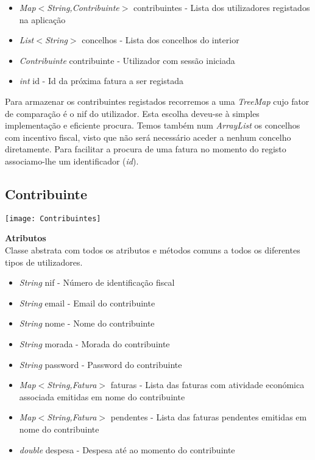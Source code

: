 \documentclass[10pt,a4paper]{article}
\begin{document}
\begin{itemize}
 \item \textit{Map$<$String,Contribuinte$>$} contribuintes - Lista dos utilizadores registados na aplicação
 \item \textit{List$<$String$>$} concelhos - Lista dos concelhos do interior
 \item \textit{Contribuinte} contribuinte - Utilizador com sessão iniciada
 \item \textit{int} id - Id da próxima fatura a ser registada
\end{itemize}

Para armazenar os contribuintes registados recorremos a uma \textit{TreeMap} cujo fator de comparação é o nif do utilizador. Esta escolha deveu-se à simples implementação e eficiente procura. Temos também num \textit{ArrayList} os concelhos com incentivo fiscal, visto que não será necessário aceder a nenhum concelho diretamente. Para facilitar a procura de uma fatura no momento do registo associamo-lhe um identificador (\textit{id}). 

\subsection{Contribuinte}
\label{sec:solucao}

\begin{center}
\graphicspath{ {/home/jessica/Desktop/} }
\texttt{[image: Contribuintes]}\\
\end{center}

{\bf{Atributos}}\\

Classe abstrata com todos os atributos e métodos comuns a todos os diferentes tipos de utilizadores. 

\begin{itemize}
 \item \textit{String} nif - Número de identificação fiscal
 \item \textit{String} email - Email do contribuinte
 \item \textit{String} nome - Nome do contribuinte
 \item \textit{String} morada - Morada do contribuinte
 \item \textit{String} password - Password do contribuinte
 \item \textit{Map$<$String,Fatura$>$} faturas - Lista das faturas com atividade económica associada emitidas em nome do contribuinte
 \item \textit{Map$<$String,Fatura$>$} pendentes - Lista das faturas pendentes emitidas em nome do contribuinte
 \item \textit{double} despesa -  Despesa até ao momento do contribuinte
\end{itemize}
\end{document}
